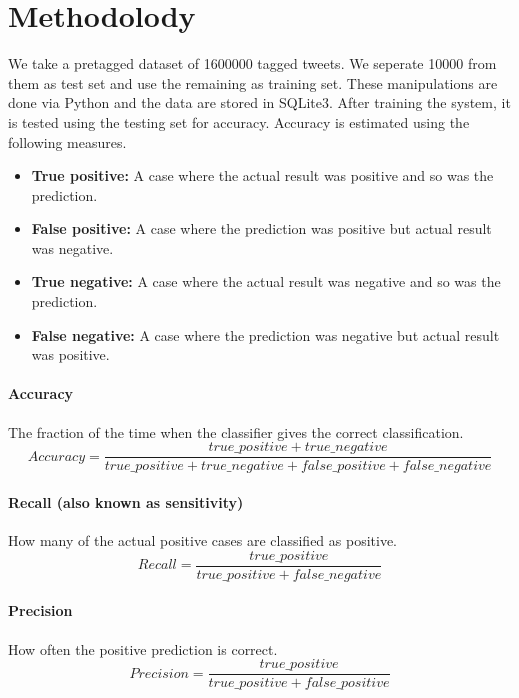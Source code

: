 \documentclass[12pt]{article}
\begin{document}
\section{Methodolody}
We take a pretagged dataset of 1600000 tagged tweets. We seperate 10000 from them as test set and use the remaining as training set. These manipulations are done via Python and the data are stored in SQLite3. After training the system, it is tested using the testing set for accuracy.
Accuracy is estimated using the following measures.
\begin{itemize}
\item \textbf{True positive:} A case where the actual result was positive and so was the prediction.
\item \textbf{False positive:} A case where the prediction was positive but actual result was negative.
\item \textbf{True negative:} A case where the actual result was negative and so was the prediction.
\item \textbf{False negative:} A case where the prediction was negative but actual result was positive.
\end{itemize}

\paragraph{Accuracy}
The fraction of the time when the classifier gives the correct classification.
\begin{equation} Accuracy = \frac{true\_positive + true\_negative}{true\_positive + true\_negative + false\_positive + false\_negative}
\end{equation} 

\paragraph{Recall (also known as sensitivity)}
How many of the actual positive cases are classified as positive.
\begin{equation} Recall = \frac{true\_positive }{true\_positive + false\_negative}
\end{equation} 
\paragraph{Precision}
How often the positive prediction is correct.
\begin{equation} Precision = \frac{true\_positive }{true\_positive + false\_positive}
\end{equation} 
\end{document}
